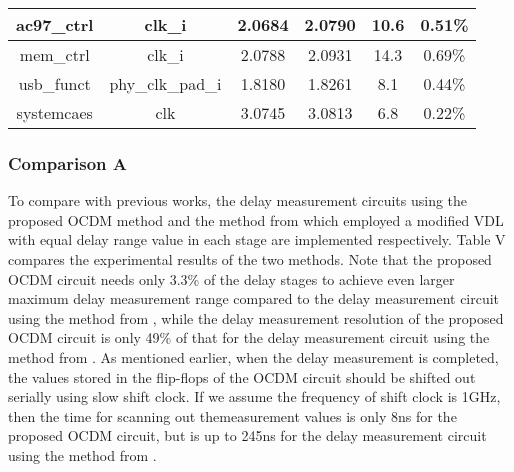 \begin{table}[]
\begin{tabular}{|c|c|c|c|c|c|}
            ac97\_ctrl    & clk\_i           & 2.0684                                                                                       & 2.0790                                                                                      & 10.6                                                           & 0.51\%                                                         \\ \hline
            mem\_ctrl     & clk\_i           & 2.0788                                                                                       & 2.0931                                                                                      & 14.3                                                           & 0.69\%                                                         \\ \hline
            usb\_funct    & phy\_clk\_pad\_i & 1.8180                                                                                       & 1.8261                                                                                      & 8.1                                                            & 0.44\%                                                         \\ \hline
            systemcaes    & clk              & 3.0745                                                                                       & 3.0813                                                                                      & 6.8                                                            & 0.22\%                                                     \\ \hline 
    \end{tabular}
\end{table}

\subsubsection{Comparison A}
To compare with previous works, the delay measurement circuits using the proposed OCDM method and the method from \cite{datta2004chip} which employed a modified VDL with equal delay range value in each stage are implemented respectively. Table V compares the experimental results of the two methods. Note that the proposed OCDM circuit needs only 3.3\% of the delay stages to achieve even larger maximum delay measurement range compared to the delay measurement circuit using the method from \cite{datta2004chip}, while the delay measurement resolution of the proposed OCDM circuit is only 49\% of that for the delay measurement circuit using the method from \cite{datta2004chip}. As mentioned earlier, when the delay measurement is completed, the values stored in the flip-flops of the OCDM circuit should be shifted out serially using slow shift clock. If we assume the frequency of shift clock is 1GHz, then the time for scanning out themeasurement values is only 8ns for the proposed OCDM circuit, but is up to 245ns for the delay measurement circuit using the method from \cite{datta2004chip}.


